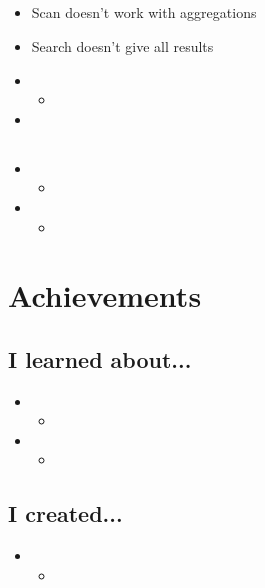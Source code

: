 \documentclass{weeklyreport}
\begin{document}
\subsection*{}

\begin{itemize}
	\item Scan doesn't work with aggregations
	\item Search doesn't give all results
	\item 
	\begin{itemize}
		\item 
	\end{itemize}
	\item 
\end{itemize}


\subsection*{}

\begin{itemize}
	\item 
	\begin{itemize}
		\item 
	\end{itemize}
	\item 
	\begin{itemize}
		\item 
	\end{itemize}
\end{itemize}

\section*{Achievements}
\subsection*{I learned about...}
\begin{itemize}
	\item 
	\begin{itemize}
		\item 
	\end{itemize}
	\item 
	\begin{itemize}
		\item 
	\end{itemize}
\end{itemize}

\subsection*{I created...}
\begin{itemize}
	\item 
	\begin{itemize}
		\item 
	\end{itemize}

\end{itemize}
\end{document}
